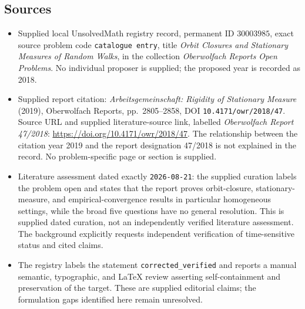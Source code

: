 \documentclass[11pt]{article}
\begin{document}
\subsection{Sources}
\begin{itemize}
\item Supplied local UnsolvedMath registry record, permanent ID \(30003985\), exact source problem code \texttt{catalogue entry}, title \emph{Orbit Closures and Stationary Measures of Random Walks}, in the collection \emph{Oberwolfach Reports Open Problems}. No individual proposer is supplied; the proposed year is recorded as 2018.
\item Supplied report citation: \emph{Arbeitsgemeinschaft: Rigidity of Stationary Measure} (2019), Oberwolfach Reports, pp.~2805--2858, DOI \texttt{10.4171/owr/2018/47}. Source URL and supplied literature-source link, labelled \emph{Oberwolfach Report 47/2018}: \url{https://doi.org/10.4171/owr/2018/47}. The relationship between the citation year 2019 and the report designation 47/2018 is not explained in the record. No problem-specific page or section is supplied.
\item Literature assessment dated exactly \texttt{2026-08-21}: the supplied curation labels the problem open and states that the report proves orbit-closure, stationary-measure, and empirical-convergence results in particular homogeneous settings, while the broad five questions have no general resolution. This is supplied dated curation, not an independently verified literature assessment. The background explicitly requests independent verification of time-sensitive status and cited claims.
\item The registry labels the statement \texttt{corrected\_verified} and reports a manual semantic, typographic, and LaTeX review asserting self-containment and preservation of the target. These are supplied editorial claims; the formulation gaps identified here remain unresolved.
\end{itemize}
\end{document}
